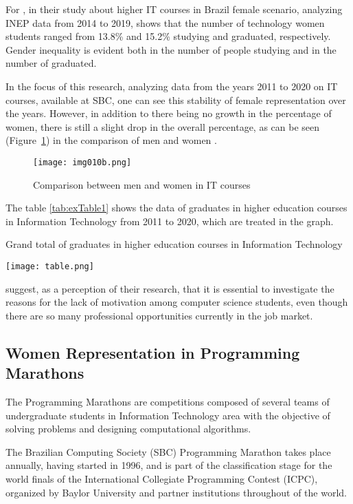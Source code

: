 \documentclass[12pt]{article}
\begin{document}
For \cite{Santos:21}, in their study about higher IT courses in Brazil female scenario, analyzing INEP data from 2014 to 2019, shows that the number of technology women students ranged from 13.8\% and 15.2\% studying and graduated, respectively. Gender inequality is evident both in the number of people studying and in the number of graduated.

In the focus of this research, analyzing data from the years 2011 to 2020 on IT courses, available at SBC, one can see this stability of female representation over the years. However, in addition to there being no growth in the percentage of women, there is still a slight drop in the overall percentage, as can be seen (Figure~\ref{fig:exampleFig1}) in the comparison of men and women \cite{SBC2:23}.

\begin{figure}[ht!]
\centering
\texttt{[image: img010b.png]}
\caption{Comparison between men and women in IT courses}
\label{fig:exampleFig1}
\end{figure}

The table \ref{tab:exTable1} shows the data of graduates in higher education courses in Information Technology from 2011 to 2020, which are treated in the graph.

\begin{table}[ht]
\centering
\caption{Grand total of graduates in higher education courses in Information Technology}
\label{tab:exTable1}
\texttt{[image: table.png]}
\end{table}

\cite{amaral:17} suggest, as a perception of their research, that it is essential to investigate the reasons for the lack of motivation among computer science students, even though there are so many professional opportunities currently in the job market.

\subsection{Women Representation in Programming Marathons}
The Programming Marathons are competitions composed of several teams of undergraduate students in Information Technology area with the objective of solving problems and designing computational algorithms.

The Brazilian Computing Society (SBC) Programming Marathon takes place annually, having started in 1996, and is part of the classification stage for the world finals of the International Collegiate Programming Contest (ICPC), organized by Baylor University and partner institutions throughout of the \cite{SBC:23} world.
 
\end{document}
